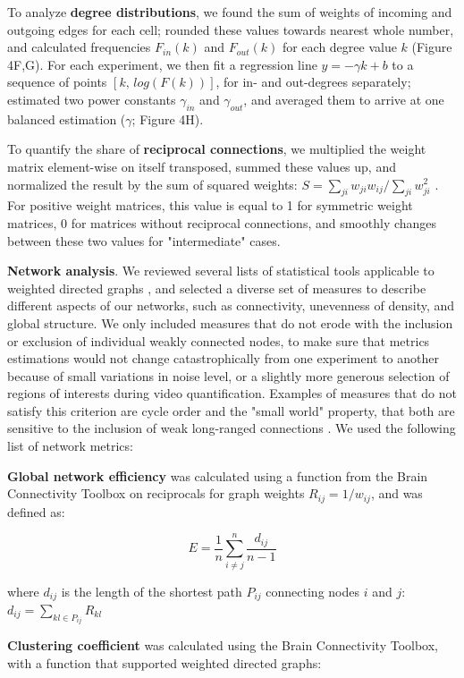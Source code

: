 \documentclass{article}
\begin{document}
To analyze \textbf{degree distributions}, we found the sum of weights of incoming and outgoing edges for each cell; rounded these values towards nearest whole number, and calculated frequencies $F_{in}(k)$ and $F_{out}(k)$ for each degree value $k$ (Figure 4F,G). For each experiment, we then fit a regression line $y = -\gamma k + b$ to a sequence of points $[k , \, log(F(k)) ]$, for in- and out-degrees separately; estimated two power constants $\gamma_{in}$ and $\gamma_{out}$, and averaged them to arrive at one balanced estimation ($\gamma$; Figure 4H).

To quantify the share of \textbf{reciprocal connections}, we multiplied the weight matrix element-wise on itself transposed, summed these values up, and normalized the result by the sum of squared weights: $S=\sum_{ji}{w_{ji} w_{ij}} / \sum_{ji}{w_{ji}^2}$ . For positive weight matrices, this value is equal to 1 for symmetric weight matrices, 0 for matrices without reciprocal connections, and smoothly changes between these two values for "intermediate" cases.

\textbf{Network analysis}. We reviewed several lists of statistical tools applicable to weighted directed graphs \citep{rubinov2010toolbox,costa2007networks,hernandez2011metrics}, and selected a diverse set of measures to describe  different aspects of our networks, such as connectivity, unevenness of density, and global structure. We only included measures that do not erode with the inclusion or exclusion of individual weakly connected nodes, to make sure that metrics estimations would not change catastrophically from one experiment to another because of small variations in noise level, or a slightly more generous selection of regions of interests during video quantification. Examples of measures that do not satisfy this criterion are cycle order and the "small world" property, that both are sensitive to the inclusion of weak long-ranged connections \citep{papo2016beware}. We used the following list of network metrics:

\textbf{Global network efficiency} was calculated using a function from the Brain Connectivity Toolbox \citep{rubinov2010toolbox} on reciprocals for graph weights $R_{ij} = 1/w_{ij}$, and was defined as:

\[ E = \frac{1}{n} \sum_{i \neq j}^n{\frac{d_{ij}}{n-1}} \]

where $d_{ij}$ is the length of the shortest path $P_{ij}$ connecting nodes $i$ and $j$: $d_{ij} = \sum_{kl \in P_{ij}}{R_{kl}}$

\textbf{Clustering coefficient} \citep{fagiolo2007} was calculated using the Brain Connectivity Toolbox, with a function that supported weighted directed graphs:
\end{document}
